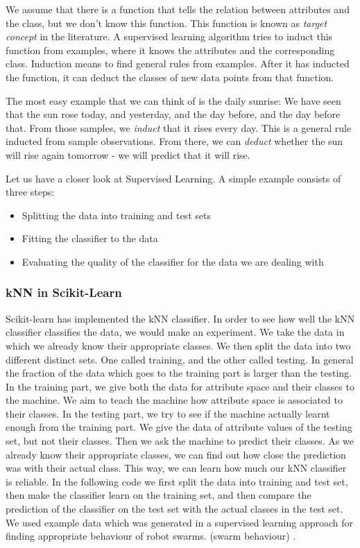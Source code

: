 \documentclass[10pt,a4paper]{article}
\begin{document}
We assume that there is a function that tells the relation between attributes and the class, but we don't know this function. This function is known as \textit{target concept} in the literature. A supervised learning algorithm tries to induct this function from examples, where it knows the attributes and the corresponding class. Induction means to find general rules from examples. After it has inducted the function, it can deduct the classes of new data points from that function.

The most easy example that we can think of is the daily sunrise: We have seen that the sun rose today, and yesterday, and the day before, and the day before that. From those samples, we \textit{induct} that it rises every day. This is a general rule inducted from sample observations. From there, we can \textit{deduct} whether the sun will rise again tomorrow - we will predict that it will rise.

Let us have a closer look at Supervised Learning. A simple example consists of three steps:
\begin{itemize}
\item Splitting the data into training and test sets
\item Fitting the classifier to the data
\item Evaluating the quality of the classifier for the data we are dealing with
\end{itemize}

\subsubsection{kNN in Scikit-Learn}
Scikit-learn has implemented the kNN classifier. In order to see how well the kNN classifier classifies the data, we would make an experiment. We take the  data in which we already know  their appropriate classes. We then split the data into two different distinct sets. One called training, and the other called testing. In general the fraction of the data which goes to the training part is larger than the testing. In the training part, we give both the data for attribute space and their classes to the machine. We aim to teach the machine how attribute space is associated to their classes. In the testing part, we try to see if the machine actually learnt enough from the training part. We give the data of attribute values of the testing set, but not their classes. Then we ask the machine to predict their classes. As we already know their appropriate classes, we can find out how close the prediction was with their actual class. This way, we can learn how much our kNN classifier is reliable. In the following code we first split the data into training and test set, then make the classifier learn on the training set, and then compare the prediction of the classifier on the test set with the actual classes in the test set. We used example data  which was generated in a supervised learning approach for finding appropriate behaviour of robot swarms. (swarm behaviour) \cite{carl}.
\label{classifier.py}
\end{document}
